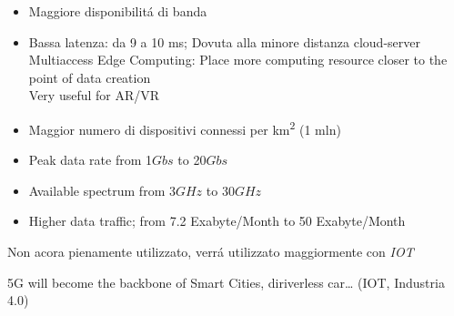 \documentclass{article}
\begin{document}
\begin{itemize}
    \item Maggiore disponibilit\'a di banda
    \item Bassa latenza: da 9 a 10 ms; Dovuta alla minore distanza cloud-server\\
        Multiaccess Edge Computing: Place more computing resource closer to the point of data creation\\
        Very useful for AR/VR

    \item Maggior numero di dispositivi connessi per km\textsuperscript{2} (1 mln)
    \item Peak data rate from 1\(Gbs\) to 20\(Gbs\)
    \item Available spectrum from 3\(GHz\) to 30\(GHz\)
    \item Higher data traffic; from 7.2 Exabyte/Month to 50 Exabyte/Month

\end{itemize}

Non acora pienamente utilizzato, verr\'a utilizzato maggiormente con \textit{IOT}

5G will become the backbone of Smart Cities, diriverless car… (IOT, Industria 4.0)
\end{document}

